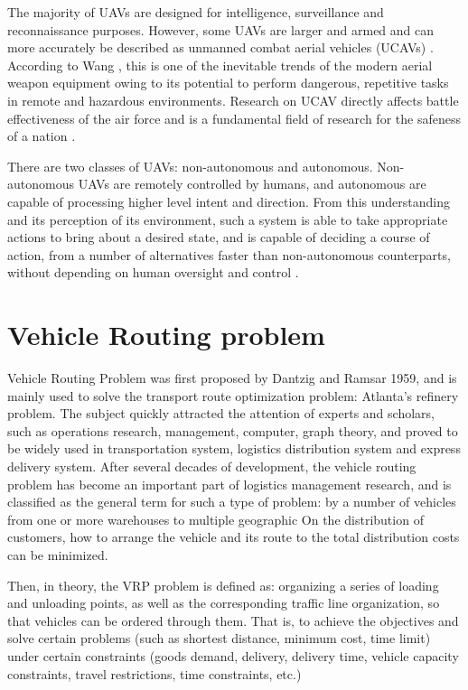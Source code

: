 The majority of UAVs are designed for intelligence, surveillance and reconnaissance purposes. However, some UAVs are larger and armed and can more accurately be described as unmanned combat aerial vehicles (UCAVs) \cite{mayer_2015}. According to Wang \cite{wang_2012}, this is one of the inevitable trends of the modern aerial weapon equipment owing to its potential to perform dangerous, repetitive tasks in remote and hazardous environments. Research on UCAV directly affects battle effectiveness of the air force and is a fundamental field of research for the safeness of a nation \cite{wang_2012}. 

There are two classes of UAVs: non-autonomous and autonomous. Non-autonomous UAVs are remotely controlled by humans, and autonomous are capable of processing higher level intent and direction. From this understanding and its perception of its environment, such a system is able to take appropriate actions to bring about a desired state, and is capable of deciding a course of action, from a number of alternatives faster than non-autonomous counterparts, without depending on human oversight and control \cite{mod_2011, bellamy_2015}.

\section{Vehicle Routing problem}

Vehicle Routing Problem was first proposed by Dantzig and Ramsar 1959, and is mainly used to solve the transport route optimization problem: Atlanta's refinery problem. The subject quickly attracted the attention of experts and scholars, such as operations research, management, computer, graph theory, and proved to be widely used in transportation system, logistics distribution system and express delivery system. After several decades of development, the vehicle routing problem has become an important part of logistics management research, and is classified as the general term for such a type of problem: by a number of vehicles from one or more warehouses to multiple geographic On the distribution of customers, how to arrange the vehicle and its route to the total distribution costs can be minimized. 

Then, in theory, the VRP problem is defined as: organizing a series of loading and unloading points, as well as the corresponding traffic line organization, so that vehicles can be ordered through them. That is, to achieve the objectives and solve certain problems (such as shortest distance, minimum cost, time limit) under certain constraints (goods demand, delivery, delivery time,
vehicle capacity constraints, travel restrictions, time constraints, etc.)

